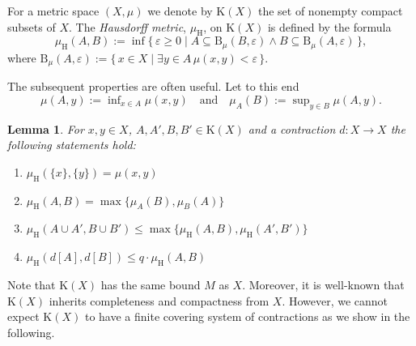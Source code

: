 \documentclass[microtype]{jloganal}
\theoremstyle{plain}
\newtheorem{lemma}[theorem]{Lemma}
\theoremstyle{definition}
\newcommand{\ball}[3]{\mathrm{B}_{#1}(#2,#3)}
\newcommand{\compact}{\mathrm{K}}
\newcommand{\hdm}{\mu_{\mathrm H}}
\newcommand{\fun}[3]{\mbox{$#1 \colon #2 \rightarrow #3$}}
\begin{document}
For a metric space $(X,\mu)$ we denote by $\compact(X)$ the set of 
nonempty compact subsets of $X$. The \emph{Hausdorff metric}, $\hdm$, 
on $\compact(X)$ is defined by the formula
\[\hdm(A,B) := \inf\{\,\varepsilon\ge 0\mid A \subseteq\ball{\mu}{B}{\varepsilon} \land
                                      B \subseteq\ball{\mu}{A}{\varepsilon} \,\}, \]
where 
$\ball{\mu}{A}{\varepsilon} := \{\,x\in X\mid\exists y\in A\,\mu(x,y)<\varepsilon\,\}$. 

The subsequent properties are often useful. Let to this end
\[
\mu(A, y) := \inf\nolimits_{x \in A} \mu(x,y) \quad \text{and} \quad \mu_A(B) := \sup\nolimits_{y \in B} \mu(A,y).
\]
\begin{lemma}\label{lem-hausm}
For $x, y \in X$, $A, A', B, B' \in \compact(X)$ and a contraction $\fun{d}{X}{X}$ the following statements hold:
\begin{enumerate}

\item\label{lem-hausm-1} $\hdm(\{ x \}, \{ y \}) = \mu(x, y)$

\item\label{lem-hausm-2} $\hdm(A,B) = \max \{ \mu_A(B), \mu_B(A) \}$

\item\label{lem-hausm-3} $\hdm(A \cup A', B \cup B') \le \max\{ \hdm(A, B), \hdm(A', B') \}$

\item\label{lem-hausm-4} $\hdm(d[A], d[B]) \le q \cdot \hdm(A, B)$

\end{enumerate}
\end{lemma}

Note that $\compact(X)$ has the same bound $M$ as $X$. Moreover, it is well-known that $\compact(X)$ inherits completeness and compactness from $X$.
However, we cannot expect $\compact(X)$ to
have a finite covering system of contractions as we show in the 
following.
\end{document}
